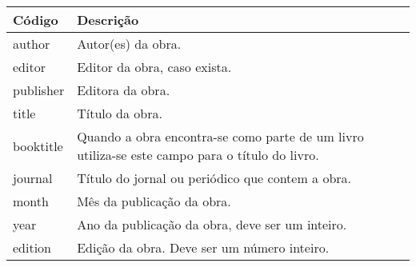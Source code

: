 % 
% 
% 
% 
% 
\begin{tabular}{lp{}}
    \hline
    Código & Descrição \\ \hline
    \textsf{author} & Autor(es) da obra. \\
    \textsf{editor} & Editor da obra, caso exista. \\
    \textsf{publisher} & Editora da obra. \\
    \textsf{title} & Título da obra. \\
    \textsf{booktitle} & Quando a obra encontra-se como parte de um livro utiliza-se este campo para o título do livro. \\
    \textsf{journal} & Título do jornal ou periódico que contem a obra. \\
    \textsf{month} & Mês da publicação da obra. \\
    \textsf{year} & Ano da publicação da obra, deve ser um inteiro. \\
    \textsf{edition} & Edição da obra. Deve ser um número inteiro. \\

\end{tabular}
